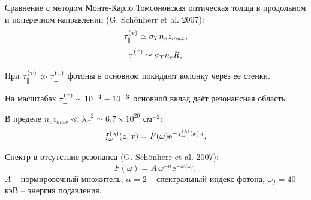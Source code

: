 \documentclass{beamer}
\newcommand{\eee}{\mathrm{e}}
\begin{document}
\begin{frame}{Сравнение с методом Монте-Карло}
	\small
	\hspace{5mm}Томсоновская оптическая толща в продольном и поперечном направлении (G. Sch\"onherr et al. 2007):
	\begin{equation}\nonumber
		\tau_\parallel^{(\text{\tiny T})} \simeq  \sigma_T n_e z_{max},
	\end{equation}
	\begin{equation}\nonumber
		\tau_{\perp}^{(\text{\tiny T})} \simeq  \sigma_T n_e R,
	\end{equation}
	
	\hspace{5mm}При $\tau_\parallel^{(\text{\tiny T})} \gg \tau_\perp^{(\text{\tiny T})}$ фотоны в основном покидают колонку через её стенки.
	
	\hspace{5mm}На масштабах $\tau_\perp^{(\text{\tiny T})} \sim 10^{-4} - 10^{-3}$ основной вклад даёт резонансная область.
	
	\hspace{5mm}В пределе $n_e z_{max} \ll \lambda_C^{-2} \simeq 6.7\times 10^{20}$ см$^{-2}$:
	\begin{equation}\nonumber
		f_\omega^{(\lambda)}(z,x)=F(\omega) 	\eee^{-{\cal \chi}_\omega^{(\lambda)}(x)\, z},
	\end{equation}
	
	\hspace{5mm}Спектр в отсутствие резонанса (G. Sch\"onherr et al. 2007):
	\begin{equation}
	\nonumber
		F(\omega) = A\,\omega^{-\alpha} \eee^{-\omega/\omega_f},
	\end{equation}
	$A$ -- нормировочный множитель, $\alpha = 2$ -- спектральный индекс фотона,  $\omega_f = 40$ кэВ -- энергия подавления.
\end{frame}

\end{document}
